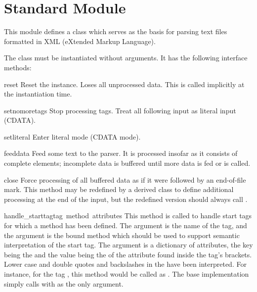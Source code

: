 \section{Standard Module }
\label{module-xmllib}

This module defines a class  which serves as the basis 
for parsing text files formatted in XML (eXtended Markup Language).

The  class must be instantiated without arguments.  It 
has the following interface methods:

\renewcommand{\indexsubitem}{({\tt XMLParser} method)}

\begin{funcdesc}{reset}{}
Reset the instance.  Loses all unprocessed data.  This is called
implicitly at the instantiation time.
\end{funcdesc}

\begin{funcdesc}{setnomoretags}{}
Stop processing tags.  Treat all following input as literal input
(CDATA).
\end{funcdesc}

\begin{funcdesc}{setliteral}{}
Enter literal mode (CDATA mode).
\end{funcdesc}

\begin{funcdesc}{feed}{data}
Feed some text to the parser.  It is processed insofar as it consists
of complete elements; incomplete data is buffered until more data is
fed or  is called.
\end{funcdesc}

\begin{funcdesc}{close}{}
Force processing of all buffered data as if it were followed by an
end-of-file mark.  This method may be redefined by a derived class to
define additional processing at the end of the input, but the
redefined version should always call .
\end{funcdesc}

\begin{funcdesc}{handle_starttag}{tag\, method\, attributes}
This method is called to handle start tags for which a
 method has been defined.  The 
argument is the name of the tag, and the  argument is the
bound method which should be used to support semantic interpretation
of the start tag.  The  argument is a dictionary of
attributes, the key being the  and the value being the
 of the attribute found inside the tag's \code{<>} brackets.
Lower case and double quotes and backslashes in the  have
been interpreted.  For instance, for the tag
, this method would be called as
.
The base implementation simply calls  with 
as the only argument.
\end{funcdesc}


